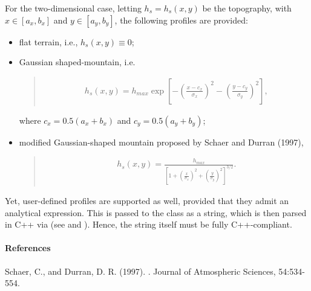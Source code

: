 \documentclass[letterpaper,10pt,english]{sphinxmanual}
\begin{document}
For the two-dimensional case, letting \(h_s = h_s(x,y)\) be the topography, with
\(x \in [a_x,b_x]\) and \(y \in [a_y,b_y]\), the following profiles are provided:
\begin{itemize}
\item {} 
flat terrain, i.e., \(h_s(x,y) \equiv 0\);

\item {} 
Gaussian shaped-mountain, i.e.
\begin{quote}
\begin{equation*}
\begin{split}h_s(x,y) = h_{max} \exp{\left[ - \left( \frac{x - c_x}{\sigma_x} \right)^2 - \left( \frac{y - c_y}{\sigma_y} \right)^2 \right]} ,\end{split}
\end{equation*}\end{quote}

where \(c_x = 0.5 (a_x + b_x)\) and \(c_y = 0.5 (a_y + b_y)\);

\item {} 
modified Gaussian-shaped mountain proposed by Schaer and Durran (1997),
\begin{quote}
\begin{equation*}
\begin{split}h_s(x,y) = \frac{h_{max}}{\left[ 1 + \left( \frac{x}{\sigma_x} \right)^2 + \left( \frac{y}{\sigma_y} \right)^2 \right]^{3/2}}.\end{split}
\end{equation*}\end{quote}

\end{itemize}

Yet, user-defined profiles are supported as well, provided that they admit an analytical expression.
This is passed to the class as a string, which is then parsed in C++ via 
(see  and ). Hence, the string itself must be
fully C++-compliant.
\paragraph{References}

Schaer, C., and Durran, D. R. (1997). . Journal of Atmospheric Sciences, 54:534-554.
\end{document}
